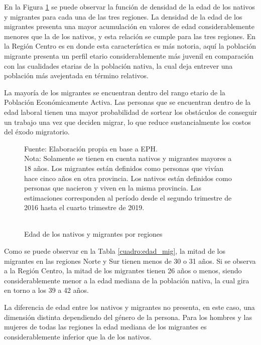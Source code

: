\documentclass[12pt,a4paper]{article}
\begin{document}
En la Figura \ref{figure:edad_mig} se puede observar la función de densidad de la edad de los nativos y migrantes para cada una de las tres regiones. La densidad de la edad de los migrantes presenta una mayor acumulación en valores de edad considerablemente menores que la de los nativos, y esta relación se cumple para las tres regiones. En la Región Centro es en donde esta característica es más notoria, aquí la población migrante presenta un perfil etario considerablemente más juvenil en comparación con las cualidades etarias de la población nativa, la cual deja entrever una población más avejentada en término relativos.

La mayoría de los migrantes se encuentran dentro del rango etario de la Población Económicamente Activa. Las personas que se encuentran dentro de la edad laboral tienen una mayor probabilidad de sortear los obstáculos de conseguir un trabajo una vez que deciden migrar, lo que reduce sustancialmente los costos del éxodo migratorio.


\begin{figure}[ht!]
\begin{center}
\caption{\\Edad de los nativos y migrantes por regiones}
 
\label{figure:edad_mig}
\begin{flushleft}
\begin{scriptsize}
Fuente: Elaboración propia en base a EPH.\\
Nota: Solamente se tienen en cuenta nativos y migrantes mayores a 18 años. Los migrantes están definidos como personas que vivían hace cinco años en otra provincia. Los nativos están definidos como personas que nacieron y viven en la misma provincia. Las estimaciones corresponden al período desde el segundo trimestre de 2016 hasta el cuarto trimestre de 2019.\\
\end{scriptsize}
\end{flushleft}
\end{center}
\end{figure}

\newpage
Como se puede observar en la Tabla \ref{cuadro:edad_mig}, la mitad de los migrantes en las regiones Norte y Sur tienen menos de 30 o 31 años. Si se observa a la Región Centro, la mitad de los migrantes tienen 26 años o menos, siendo considerablemente menor a la edad mediana de la población nativa, la cual gira en torno a los 39 a 42 años.

La diferencia de edad entre los nativos y migrantes no presenta, en este caso, una dimensión distinta dependiendo del género de la persona. Para los hombres y las mujeres de todas las regiones la edad mediana de los migrantes es considerablemente inferior que la de los nativos. 
\end{document}
